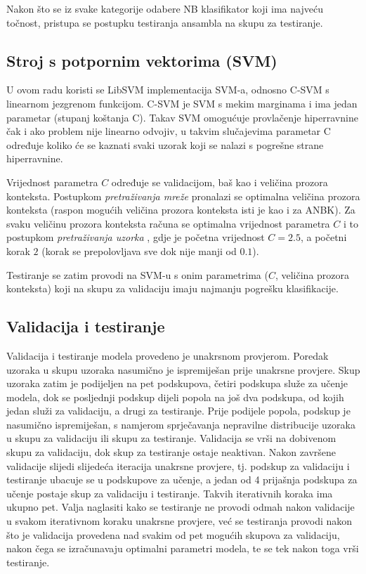 \documentclass[10pt, a4paper]{article}
\begin{document}
Nakon što se iz svake kategorije odabere NB klasifikator koji ima najveću točnost,
pristupa se postupku testiranja ansambla na skupu za testiranje.

\subsection{Stroj s potpornim vektorima (SVM)}
U ovom radu koristi se LibSVM implementacija \mbox{SVM-a}, odnosno C-SVM s linearnom
jezgrenom funkcijom. 
\mbox{C-SVM} je SVM s mekim marginama i ima jedan parametar (stupanj koštanja C).
Takav SVM omogućuje provlačenje hiperravnine čak i ako problem
nije linearno odvojiv, u takvim slučajevima parametar C određuje koliko će
se kaznati svaki uzorak koji se nalazi s pogrešne strane hiperravnine.

Vrijednost parametra $C$ određuje se validacijom, baš kao
i veličina prozora konteksta.
Postupkom \emph{pretraživanja mreže}  pronalazi se
optimalna veličina prozora konteksta (raspon mogućih veličina prozora konteksta
isti je kao i za ANBK). Za svaku veličinu prozora konteksta računa se
optimalna vrijednost parametra $C$ i to postupkom \emph{pretraživanja uzorka} ,
gdje je početna vrijednost $C = 2.5$, a početni korak $2$ (korak se prepolovljava sve dok nije manji od $0.1$).

Testiranje se zatim
provodi na SVM-u s onim parametrima ($C$, veličina prozora konteksta)
koji na skupu za validaciju imaju najmanju pogrešku klasifikacije.

\subsection{Validacija i testiranje}
Validacija i testiranje modela provedeno je unakrsnom provjerom.
Poredak uzoraka u skupu uzoraka nasumično je ispremiješan prije
unakrsne provjere.
Skup uzoraka zatim je podijeljen na pet podskupova, četiri podskupa
služe za učenje modela, dok se posljednji podskup dijeli popola
na još dva podskupa, od kojih jedan služi za validaciju, a drugi za testiranje.
Prije podijele popola, podskup je nasumično ispremiješan, s
namjerom sprječavanja nepravilne distribucije uzoraka u skupu za validaciju
ili skupu za testiranje. Validacija se vrši na dobivenom skupu za validaciju, 
dok skup za testiranje ostaje neaktivan. Nakon završene validacije
slijedi slijedeća iteracija unakrsne provjere, tj. podskup za validaciju
i testiranje ubacuje se u podskupove za učenje, a jedan od 4 prijašnja podskupa
za učenje postaje skup za validaciju i testiranje. Takvih iterativnih koraka ima ukupno
pet. Valja naglasiti kako se testiranje ne provodi odmah nakon validacije u svakom
iterativnom koraku unakrsne provjere, već se testiranja provodi nakon što je validacija
provedena nad svakim od pet mogućih skupova za validaciju, nakon čega se izračunavaju
optimalni parametri modela, te se tek nakon toga vrši testiranje. 
\end{document}
